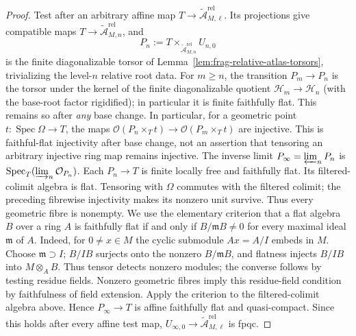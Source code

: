\documentclass[11pt]{article}
\theoremstyle{definition}
\theoremstyle{remark}
\begin{document}
\begin{proof}
Test after an arbitrary affine map
$T\to\widetilde{\mathcal A}_{M,\ell}^{\mathrm{rel}}$.  Its projections give
compatible maps $T\to\widetilde{\mathcal A}_{M,n}^{\mathrm{rel}}$, and
\[
 P_n:=T\times_{\widetilde{\mathcal A}_{M,n}^{\mathrm{rel}}}U_{n,0}
\]
is the finite diagonalizable torsor of
Lemma~\ref{lem:frag-relative-atlas-torsors}, trivializing the level-$n$
relative root data.  For $m\geq n$, the transition $P_m\to P_n$ is the torsor under
the kernel of the finite diagonalizable quotient
$\mathcal H_m\to\mathcal H_n$ (with the base-root factor rigidified);
in particular it is finite faithfully flat.  This remains so after
\emph{any} base change.  In particular, for a geometric point
$t:\operatorname{Spec}\Omega\to T$, the maps
$\mathcal O(P_n\times_Tt)\to\mathcal O(P_m\times_Tt)$ are injective.
This is faithful-flat injectivity after base change, not an assertion
that tensoring an arbitrary injective ring map remains injective.  The inverse limit
$P_\infty=\varprojlim_nP_n$ is
$\operatorname{Spec}_T(\varinjlim_n\mathcal O_{P_n})$.  Each $P_n\to T$ is
finite locally free and faithfully flat.  Its filtered-colimit algebra is
flat.  Tensoring with $\Omega$ commutes with the filtered colimit;
the preceding fibrewise injectivity makes its nonzero unit survive.
Thus every geometric fibre is nonempty.  We use the elementary
criterion that a flat algebra $B$ over a ring $A$ is faithfully flat
if and only if $B/\mathfrak mB\ne0$ for every maximal ideal
$\mathfrak m$ of $A$.  Indeed, for $0\ne x\in M$ the cyclic
submodule $Ax=A/I$ embeds in $M$.  Choose $\mathfrak m\supset I$;
$B/IB$ surjects onto the nonzero $B/\mathfrak mB$, and flatness
injects $B/IB$ into $M\otimes_AB$.  Thus tensor detects nonzero
modules; the converse follows by testing residue fields.
Nonzero geometric fibres imply this residue-field condition by
faithfulness of field extension.  Apply the criterion to the
filtered-colimit algebra above.
Hence $P_\infty\to T$ is affine faithfully flat and quasi-compact.  Since
this holds after every affine test map, $U_{\infty,0}\to
\widetilde{\mathcal A}_{M,\ell}^{\mathrm{rel}}$ is fpqc.


\end{proof}
\end{document}
